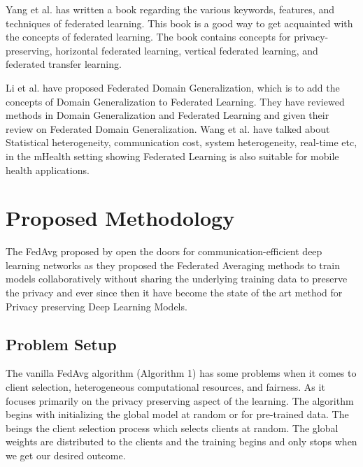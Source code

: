 \documentclass[conference]{IEEEtran}
\begin{document}
\par Yang et al. \cite{yang2019federated} has written a book regarding the various keywords, features, and techniques of federated learning. This book is a good way to get acquainted with the concepts of federated learning. The book contains concepts for privacy-preserving, horizontal federated learning, vertical federated learning, and federated transfer learning. \par
Li et al. \cite{li2023federated} have proposed Federated Domain Generalization, which is to add the concepts of Domain Generalization to Federated Learning. They have reviewed methods in Domain Generalization and Federated Learning and given their review on Federated Domain Generalization. Wang et al. \cite{wang2023applications} have talked about Statistical heterogeneity, communication cost, system heterogeneity, real-time etc, in the mHealth setting showing Federated Learning is also suitable for mobile health applications.

\section{Proposed Methodology}
The FedAvg proposed by \cite{mcmahan2017communication} open the doors for communication-efficient deep learning networks as they proposed the Federated Averaging methods to train models collaboratively without sharing the underlying training data to preserve the privacy and ever since then it have become the state of the art method for Privacy preserving Deep Learning Models. 
\subsection{Problem Setup} 
The vanilla FedAvg algorithm (Algorithm 1) has some problems when it comes to client selection, heterogeneous computational resources, and fairness. As it focuses primarily on the privacy preserving aspect of the learning. The algorithm begins with initializing the global model at random or for pre-trained data. The beings the client selection process which selects clients at random. The global weights are distributed to the clients and the training begins and only stops when we get our desired outcome.
\end{document}
